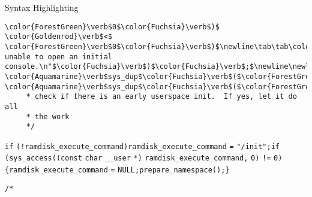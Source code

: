 \begin{frame}{Syntax Highlighting}
\begin{verbatim}
\color{ForestGreen}\verb$0$\color{Fuchsia}\verb$)$ \color{Goldenrod}\verb$<$ \color{ForestGreen}\verb$0$\color{Fuchsia}\verb$)$\newline\tab\tab\color{Aquamarine}\verb$pr_err$\color{Fuchsia}\verb$($\color{Emerald}\verb$"Warning: unable to open an initial console.\n"$\color{Fuchsia}\verb$)$\color{Fuchsia}\verb$;$\newline\newline\tab\color{Fuchsia}\verb$($\color{BurntOrange}\verb$void$\color{Fuchsia}\verb$)$ \color{Aquamarine}\verb$sys_dup$\color{Fuchsia}\verb$($\color{ForestGreen}\verb$0$\color{Fuchsia}\verb$)$\color{Fuchsia}\verb$;$\newline\tab\color{Fuchsia}\verb$($\color{BurntOrange}\verb$void$\color{Fuchsia}\verb$)$ \color{Aquamarine}\verb$sys_dup$\color{Fuchsia}\verb$($\color{ForestGreen}\verb$0$\color{Fuchsia}\verb$)$\color{Fuchsia}\verb$;$\newline\tab\color{Rhodamine}\begin{verbatim}/*
	 * check if there is an early userspace init.  If yes, let it do all
	 * the work
	 */\end{verbatim}\leavevmode\newline\newline\tab\color{BurntOrange}\verb$if$ \color{Fuchsia}\verb$($\color{Goldenrod}\verb$!$\color{Aquamarine}\verb$ramdisk_execute_command$\color{Fuchsia}\verb$)$\newline\tab\tab\color{Aquamarine}\verb$ramdisk_execute_command$ \color{Fuchsia}\verb$=$ \color{Emerald}\verb$"/init"$\color{Fuchsia}\verb$;$\newline\newline\tab\color{BurntOrange}\verb$if$ \color{Fuchsia}\verb$($\color{Aquamarine}\verb$sys_access$\color{Fuchsia}\verb$($\color{Fuchsia}\verb$($\color{BurntOrange}\verb$const$ \color{BurntOrange}\verb$char$ \color{Aquamarine}\verb$__user$ \color{Goldenrod}\verb$*$\color{Fuchsia}\verb$)$ \color{Aquamarine}\verb$ramdisk_execute_command$\color{Fuchsia}\verb$,$ \color{ForestGreen}\verb$0$\color{Fuchsia}\verb$)$ \color{Goldenrod}\verb$!=$ \color{ForestGreen}\verb$0$\color{Fuchsia}\verb$)$ \color{Fuchsia}\verb${$\newline\tab\tab\color{Aquamarine}\verb$ramdisk_execute_command$ \color{Fuchsia}\verb$=$ \color{Aquamarine}\verb$NULL$\color{Fuchsia}\verb$;$\newline\tab\tab\color{Aquamarine}\verb$prepare_namespace$\color{Fuchsia}\verb$($\color{Fuchsia}\verb$)$\color{Fuchsia}\verb$;$\newline\tab\color{Fuchsia}\verb$}$\newline\newline\tab\color{Rhodamine}\begin{verbatim}/*

\end{verbatim}
\end{frame}
